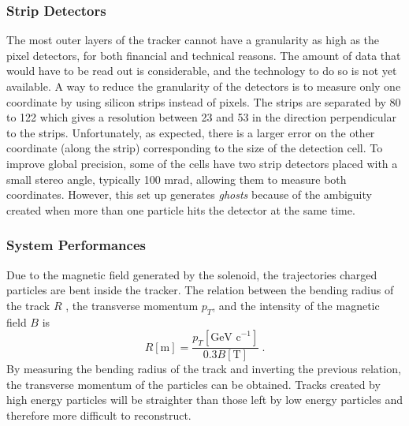            \subsubsection{Strip Detectors}

                The most outer layers of the tracker cannot have a granularity as high as the pixel detectors, for both financial and technical reasons. The amount of data that would have to be read out is considerable, and the technology to do so is not yet available. A way to reduce the granularity of the detectors is to measure only one coordinate by using silicon strips instead of pixels. The strips are separated by 80 to 122 \um{} which gives a resolution between 23 \um{} and 53 \um{} in the direction perpendicular to the strips. Unfortunately, as expected, there is a larger error on the other coordinate (along the strip) corresponding to the size of the detection cell. To improve global precision, some of the cells have two strip detectors placed with a small stereo angle, typically 100 mrad, allowing them to measure both coordinates. However, this set up generates \emph{ghosts} because of the ambiguity created when more than one particle hits the detector at the same time.
            
            \subsubsection{System Performances}  
            \label{sec:lhc_and_cms__tracker_system_performances}        

                Due to the magnetic field generated by the solenoid, the trajectories charged particles are bent inside the tracker. The relation between the bending radius of the track $ R $ , the transverse momentum $ p_T $, and the intensity of the magnetic field $ B $ is
                \begin{equation}
                    R[\mbox{m}] = \frac{p_T[\mbox{GeV c}^{-1}]}{0.3 B[\mbox{T}]} \ .
                    \label{eq:lhc_and_cms__radius_to_momentum_relation}
                \end{equation}
                By measuring the bending radius of the track and inverting the previous relation, the transverse momentum of the particles can be obtained. Tracks created by high energy particles will be straighter than those left by low energy particles and therefore more difficult to reconstruct. \\

